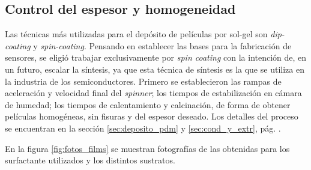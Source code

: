 	\subsection{Control del espesor y homogeneidad}
		
		Las técnicas más utilizadas para el depósito de películas por sol-gel son \textit{dip-coating} y \textit{spin-coating}. 
		Pensando en establecer las bases para la fabricación de sensores, se eligió trabajar exclusivamente por \textit{spin coating} con la intención de, en un futuro, escalar la síntesis, ya que esta técnica de síntesis es la que se utiliza en la industria de los semiconductores.\cite{Franssila2004,Jaeger2001} Primero se establecieron las rampas de aceleración y velocidad final del \textit{spinner}; los tiempos de estabilización en cámara de humedad; los tiempos de calentamiento y calcinación, de forma de obtener películas homogéneas, sin fisuras y del espesor deseado. Los detalles del proceso se encuentran en la sección \ref{sec:deposito_pdm} y \ref{sec:cond_y_extr}, pág. \pageref{sec:deposito_pdm}. 

		En la figura \ref{fig:fotos_films} se muestran fotografías de las \pdm\space obtenidas para los surfactante utilizados y los distintos sustratos. 

